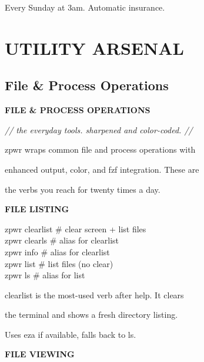 \documentclass[11pt,a4paper,twoside]{book}
\begin{document}
Every Sunday at 3am. Automatic insurance.


\vspace{16pt}


\chapter{UTILITY ARSENAL}

\section{File \& Process Operations}


\vspace{10pt}
{\large\bfseries\color{neoncyan} FILE \& PROCESS OPERATIONS}\vspace{6pt}

{\small\itshape\color{dimtext} // the everyday tools. sharpened and color-coded. //}

\begin{codebox}
zpwr wraps common file and process operations with\\
\end{codebox}

enhanced output, color, and fzf integration. These are

the verbs you reach for twenty times a day.


\vspace{12pt}
{\bfseries\color{neonyellow} FILE LISTING}\vspace{4pt}

\begin{codebox}
zpwr clearlist                      \# clear screen + list files\\
zpwr clearls                        \# alias for clearlist\\
zpwr info                           \# alias for clearlist\\
zpwr list                           \# list files (no clear)\\
zpwr ls                             \# alias for list\\
\end{codebox}

clearlist is the most-used verb after help. It clears

the terminal and shows a fresh directory listing.

Uses eza if available, falls back to ls.


\vspace{12pt}
{\bfseries\color{neonyellow} FILE VIEWING}\vspace{4pt}
\end{document}
